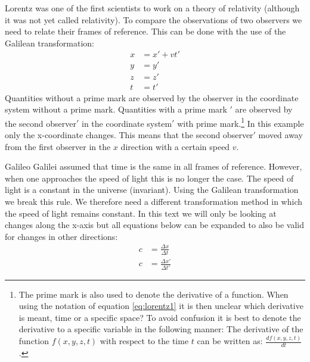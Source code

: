 \documentclass[12pt,a4paper]{article}
\numberwithin{equation}{section}
\numberwithin{figure}{section}
\numberwithin{table}{section}
\begin{document}
Lorentz was one of the first scientists to work on a theory of relativity (although it was not yet called relativity). To compare the observations of two observers we need to relate their frames of reference. This can be done with the use of the Galilean transformation:
\begin{equation}\label{eq:lorentz1}\begin{aligned}
x &= x' + vt' \\
y &= y' \\
z &= z' \\
t &= t'
\end{aligned}\end{equation}
Quantities without a prime mark are observed by the observer in the coordinate system without a prime mark. Quantities with a prime mark $'$ are observed by the second observer$'$ in the coordinate system$'$ with prime mark.\footnote{The prime mark is also used to denote the derivative of a function. When using the notation of equation \ref{eq:lorentz1} it is then unclear which derivative is meant, time or a specific space? To avoid confusion it is best to denote the derivative to a specific variable in the following manner: The derivative of the function $f(x,y,z,t)$ with respect to the time $t$ can be written as: $\frac{df(x,y,z,t)}{dt}$.}
In this example only the x-coordinate changes. This means that the second observer$'$ moved away from the first observer in the $x$ direction with a certain speed $v$.

Galileo Galilei assumed that time is the same in all frames of reference. However, when one approaches the speed of light this is no longer the case. The speed of light is a constant in the universe (invariant). Using the Galilean transformation we break this rule. We therefore need a different transformation method in which the speed of light remains constant. In this text we will only be looking at changes along the x-axis but all equations below can be expanded to also be valid for changes in other directions:
\begin{equation}\label{eq:lorentz2} \begin{aligned}
c &= \frac{\Delta x}{\Delta t} \\
c &= \frac{\Delta x'}{\Delta t'}
\end{aligned}\end{equation}
\end{document}

